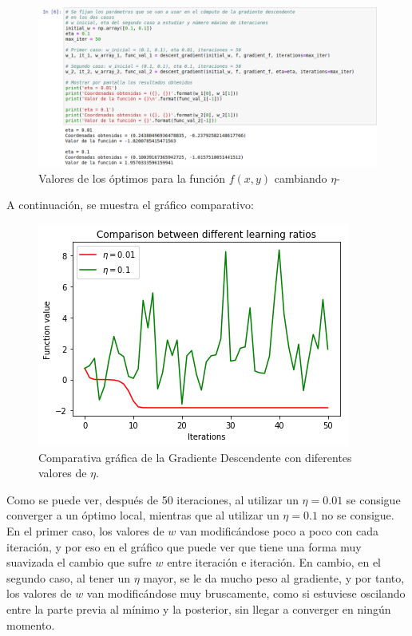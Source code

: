 \documentclass[11pt,a4paper]{article}
\begin{document}
\begin{figure}[H]
\centering
\includegraphics[scale=0.4]{img/jnbook_ej_3_a.png}
\caption{Valores de los óptimos para la función $f(x, y)$ cambiando $\eta$-}
\end{figure}

A continuación, se muestra el gráfico comparativo:

\begin{figure}[H]
\centering
\includegraphics[scale=0.8]{img/comparison_lr.png}
\caption{Comparativa gráfica de la Gradiente Descendente con diferentes valores de $\eta$.}
\end{figure}

Como se puede ver, después de 50 iteraciones, al utilizar un $\eta = 0.01$ se consigue converger a un óptimo local, mientras
que al utilizar un $\eta = 0.1$ no se consigue. En el primer caso, los valores de $w$ van modificándose poco a poco con cada
iteración, y por eso en el gráfico que puede ver que tiene una forma muy suavizada el cambio que sufre $w$ entre iteración e
iteración. En cambio, en el segundo caso, al tener un $\eta$ mayor, se le da mucho peso al gradiente, y por tanto, los
valores de $w$ van modificándose muy bruscamente, como si estuviese oscilando entre la parte previa al mínimo y la
posterior, sin llegar a converger en ningún momento.\\
\end{document}
